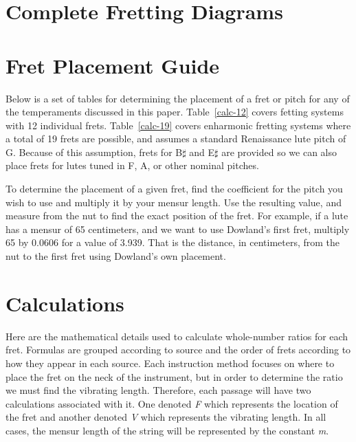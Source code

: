 \appendix

\chapter{Complete Fretting Diagrams}





\chapter{Fret Placement Guide}

Below is a set of tables for determining the placement of a fret or pitch for any of the 
temperaments discussed in this paper. Table~\ref{calc-12} covers fetting systems with
12 individual frets.  Table~\ref{calc-19} covers enharmonic fretting systems where
a total of 19 frets are possible, and assumes a standard Renaissance lute pitch of
G.  Because of this assumption, frets for B$\sharp$ and E$\sharp$ are provided so 
we can also place frets for lutes tuned in F, A, or other nominal pitches.

To determine the placement of a given fret, find the coefficient for the pitch
you wish to use and multiply it by your mensur length.  Use the resulting value,
and measure from the nut to find the exact position of the fret.  For example,
if a lute has a mensur of 65 centimeters, and we want to use Dowland's first fret,
multiply 65 by 0.0606 for a value of 3.939.  That is the distance, in centimeters,
from the nut to the first fret using Dowland's own placement.





\chapter{Calculations}

Here are the mathematical details used to calculate whole-number ratios for each fret.
Formulas are grouped according to source and the order of frets according to how they
appear in each source.  Each instruction method focuses on where to place the fret on
the neck of the instrument, but in order to determine the ratio we must find the
vibrating length. Therefore, each passage will have two calculations associated with
it.  One denoted \textit{F} which represents the location of the fret and another
denoted \textit{V} which represents the vibrating length.  In all cases, the mensur
length of the string will be represented by the constant \textit{m}.

